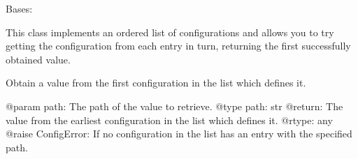 \documentclass[a4paper,10pt,english]{sphinxmanual}
\begin{document}
\begin{fulllineitems}
\label{\detokenize{apidoc_src/src:src.pyconf.ConfigList}}
Bases: 

This class implements an ordered list of configurations and allows you
to try getting the configuration from each entry in turn, returning
the first successfully obtained value.

\begin{fulllineitems}
\label{\detokenize{apidoc_src/src:src.pyconf.ConfigList.getByPath}}
Obtain a value from the first configuration in the list which defines
it.

@param path: The path of the value to retrieve.
@type path: str
@return: The value from the earliest configuration in the list which
defines it.
@rtype: any
@raise ConfigError: If no configuration in the list has an entry with
the specified path.

\end{fulllineitems}


\end{fulllineitems}

\end{document}
